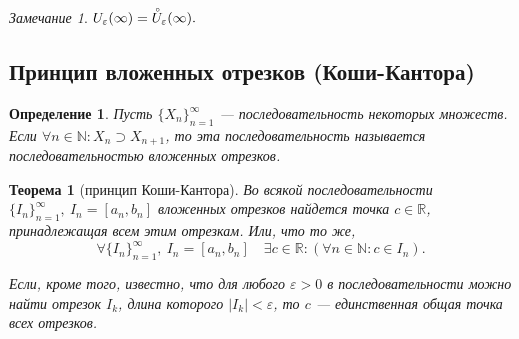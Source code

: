 \documentclass[a4paper,12pt]{article} %
\newtheorem{definition}{Определение}[section]
\newtheorem{theorem}{Теорема}[section]
\theoremstyle{remark}
\newtheorem*{remark}{Замечание}
\theoremstyle{definition}
\begin{document}
\begin{remark}
$U_\varepsilon(\infty)=\accentset{\circ}{U}_\varepsilon(\infty).$
\end{remark}

\subsection{Принцип вложенных отрезков (Коши-Кантора)}
\begin{definition}
	Пусть $\{X_n\}_{n=1}^{\infty}$ --- последовательность некоторых множеств. Если $\forall n\in \mathbb{N}:X_n\supset X_{n+1}$, то эта последовательность называется последовательностью вложенных отрезков.
\end{definition}
\begin{theorem}[принцип Коши-Кантора]
	Во всякой последовательности $\{I_n\}_{n=1}^{\infty}, \ I_n = [a_n, b_n]$ вложенных отрезков найдется точка $c \in \mathbb{R}$, принадлежащая всем этим отрезкам. Или, что то же,
	\[
	\forall \{I_n\}_{n=1}^{\infty}, \ I_n = [a_n, b_n] \quad \exists c\in \mathbb{R} : (\forall n\in \mathbb{N} : c \in I_n)
	.\] 

	Если, кроме того, известно, что для любого $\varepsilon > 0$ в последовательности можно найти отрезок $I_k$, длина которого $|I_k| < \varepsilon$, то $c$ --- единственная общая точка всех отрезков.
\end{theorem}
\end{document}
